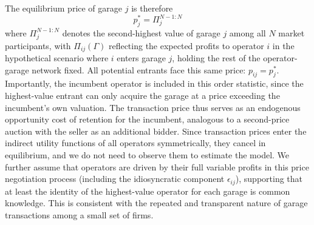 \documentclass[12pt]{article}
\begin{document}
The equilibrium price of garage $j$ is therefore
\begin{equation}\label{eq:eqprice}
p_{j}^* = \Pi_{j}^{N-1:N}
\end{equation}
where $\Pi_{j}^{N-1:N}$ denotes the second-highest value of garage $j$ among 
all $N$ market participants, with $\Pi_{ij}(\Gamma)$ reflecting the expected 
profits to operator $i$ in the hypothetical scenario where $i$ enters garage 
$j$, holding the rest of the operator-garage network fixed. All potential 
entrants face this same price: $p_{ij} = p_{j}^*$. Importantly, the incumbent 
operator is included in this order statistic, since the highest-value entrant 
can only acquire the garage at a price exceeding the incumbent's own valuation. 
The transaction price thus serves as an endogenous opportunity cost of 
retention for the incumbent, analogous to a second-price auction with the 
seller as an additional bidder. Since transaction prices enter the indirect utility functions of all operators symmetrically, they cancel in equilibrium, and we do not 
need to observe them to estimate the model. We further assume that operators 
are driven by their full variable profits in this price negotiation process (including the 
idiosyncratic component $\epsilon_{ij}$), supporting that at least the identity of the 
highest-value operator for each garage is common knowledge. This is consistent 
with the repeated and transparent nature of garage transactions among a small 
set of firms.
\end{document}
